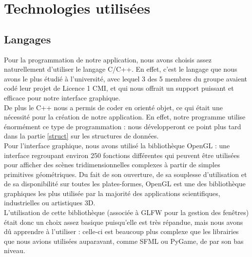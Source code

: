 \documentclass[twoside]{report}
\begin{document}

\chapter{Technologies utilisées}
\section{Langages}
Pour la programmation de notre application, nous avons choisis assez naturellement d'utiliser le langage C/C++. En effet, c'est le langage que nous avons le plus étudié à l'université, avec lequel 3 des 5 membres du groupe avaient codé leur projet de Licence 1 CMI, et qui nous offrait un support puissant et efficace pour notre interface graphique. \\
De plus le C++ nous a permis de coder en orienté objet, ce qui était une nécessité pour la création de notre application. En effet, notre programme utilise énormément ce type de programmation : nous développeront ce point plus tard dans la partie \ref{struct} sur les structures de données. \\

Pour l'interface graphique, nous avons utilisé la bibliothèque OpenGL : une interface regroupant environ 250 fonctions différentes qui peuvent être utilisées pour afficher des scènes tridimensionnelles complexes à partir de simples primitives géométriques. Du fait de son ouverture, de sa souplesse d'utilisation et de sa disponibilité sur toutes les plates-formes, OpenGL est une des bibliothèque graphiques les plus utilisée par la majorité des applications scientifiques, industrielles ou artistiques 3D. \\
L'utilisation de cette bibliothèque (associée à GLFW pour la gestion des fenêtres) était donc un choix assez basique puisqu'elle est très répandue, mais nous avons dû apprendre à l'utiliser : celle-ci est beaucoup plus complexe que les librairies que nous avions utilisées auparavant, comme SFML ou PyGame, de par son bas niveau. \\
\end{document}
